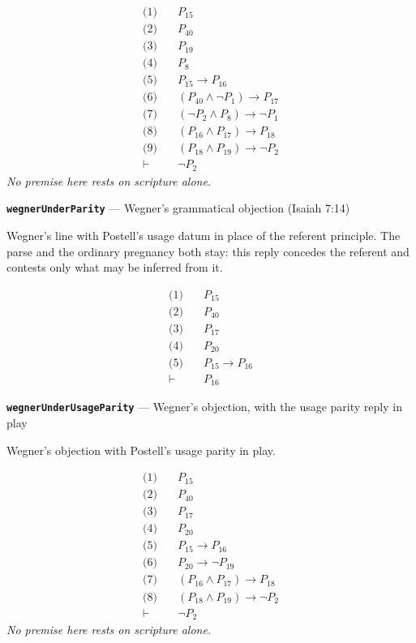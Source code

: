 \documentclass[11pt]{article}
\begin{document}
\begin{align*}
  \text{(1)} \quad & P_{15} \\
  \text{(2)} \quad & P_{40} \\
  \text{(3)} \quad & P_{19} \\
  \text{(4)} \quad & P_{8} \\
  \text{(5)} \quad & P_{15} \rightarrow P_{16} \\
  \text{(6)} \quad & (P_{40} \land \lnot P_{1}) \rightarrow P_{17} \\
  \text{(7)} \quad & (\lnot P_{2} \land P_{8}) \rightarrow \lnot P_{1} \\
  \text{(8)} \quad & (P_{16} \land P_{17}) \rightarrow P_{18} \\
  \text{(9)} \quad & (P_{18} \land P_{19}) \rightarrow \lnot P_{2} \\
  \vdash \quad & \lnot P_{2}
\end{align*}
\emph{No premise here rests on scripture alone.}
\par\medskip\noindent\textbf{\texttt{wegner\allowbreak{}Under\allowbreak{}Parity}} --- Wegner's grammatical objection (Isaiah 7:14)\par\nobreak\noindent
Wegner's line with Postell's usage datum in place of the referent principle. The parse and the ordinary pregnancy both stay: this reply concedes the referent and contests only what may be inferred from it.

\begin{align*}
  \text{(1)} \quad & P_{15} \\
  \text{(2)} \quad & P_{40} \\
  \text{(3)} \quad & P_{17} \\
  \text{(4)} \quad & P_{20} \\
  \text{(5)} \quad & P_{15} \rightarrow P_{16} \\
  \vdash \quad & P_{16}
\end{align*}
\par\medskip\noindent\textbf{\texttt{wegner\allowbreak{}Under\allowbreak{}Usage\allowbreak{}Parity}} --- Wegner's objection, with the usage parity reply in play\par\nobreak\noindent
Wegner's objection with Postell's usage parity in play.

\begin{align*}
  \text{(1)} \quad & P_{15} \\
  \text{(2)} \quad & P_{40} \\
  \text{(3)} \quad & P_{17} \\
  \text{(4)} \quad & P_{20} \\
  \text{(5)} \quad & P_{15} \rightarrow P_{16} \\
  \text{(6)} \quad & P_{20} \rightarrow \lnot P_{19} \\
  \text{(7)} \quad & (P_{16} \land P_{17}) \rightarrow P_{18} \\
  \text{(8)} \quad & (P_{18} \land P_{19}) \rightarrow \lnot P_{2} \\
  \vdash \quad & \lnot P_{2}
\end{align*}
\emph{No premise here rests on scripture alone.}
\end{document}
